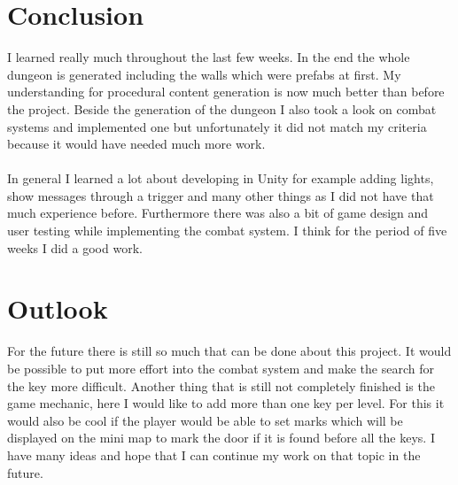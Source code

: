 \documentclass[a4paper,11pt,oneside]{scrreprt}
\begin{document}
\section{Conclusion}
\label{section:conclusion}
I learned really much throughout the last few weeks. In the end the whole dungeon is generated including the walls which were prefabs at first. My understanding for procedural content generation is now much better than before the project. Beside the generation of the dungeon I also took a look on combat systems and implemented one but unfortunately it did not match my criteria because it would have needed much more work.  
\\
\\
In general I learned a lot about developing in Unity for example adding lights, show messages through a trigger and many other things as I did not have that much experience before. Furthermore there was also a bit of game design and user testing while implementing the combat system. I think for the period of five weeks I did a good work.

\section{Outlook}
\label{section:outlook}
For the future there is still so much that can be done about this project. It would be possible to put more effort into the combat system and make the search for the key more difficult. Another thing that is still not completely finished is the game mechanic, here I would like to add more than one key per level. For this it would also be cool if the player would be able to set marks which will be displayed on the mini map to mark the door if it is found before all the keys. I have many ideas and hope that I can continue my work on that topic in the future.

\clearpage
{}
{}
\listoffigures

\clearpage
{}
{}
\listoflistings

\clearpage
{}
{}
\printbibliography
\end{document}
